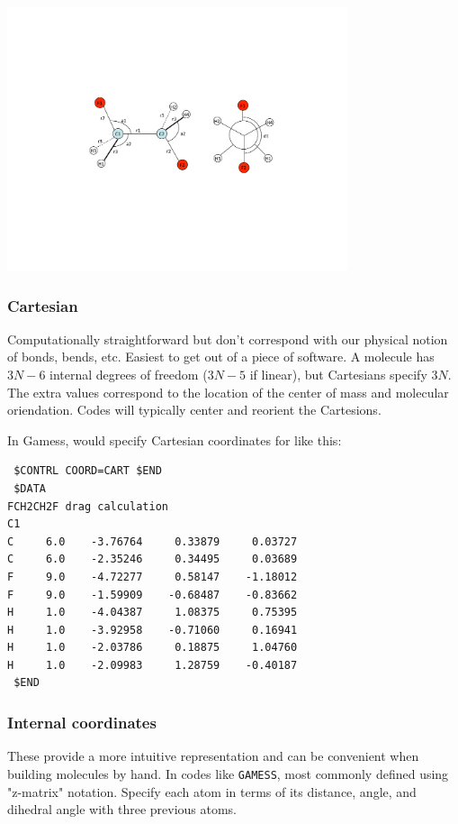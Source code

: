 \documentclass[11pt]{article}
\begin{document}
\begin{center}
\includegraphics[width=0.75\textwidth]{./Images/Internals.pdf}
\end{center}

\subsubsection{Cartesian}
\label{sec-6-1-1}
Computationally straightforward but don't correspond with our physical notion of bonds,
bends, etc.  Easiest to get out of a piece of software.  A molecule has \(3 N-6 \) internal degrees of freedom (\(3N-5\) if linear), but Cartesians specify \(3N\).  The extra values correspond to the location of the center of mass and molecular oriendation.  Codes will typically center and reorient the Cartesions.

In Gamess, would specify Cartesian coordinates for  like this:
\begin{verbatim}
 $CONTRL COORD=CART $END
 $DATA
FCH2CH2F drag calculation
C1
C     6.0    -3.76764     0.33879     0.03727
C     6.0    -2.35246     0.34495     0.03689
F     9.0    -4.72277     0.58147    -1.18012
F     9.0    -1.59909    -0.68487    -0.83662
H     1.0    -4.04387     1.08375     0.75395
H     1.0    -3.92958    -0.71060     0.16941
H     1.0    -2.03786     0.18875     1.04760
H     1.0    -2.09983     1.28759    -0.40187
 $END
\end{verbatim}
\subsubsection{Internal coordinates}
\label{sec-6-1-2}
These provide a more intuitive representation and can be convenient when building molecules by hand.  In codes like \texttt{GAMESS}, most commonly defined using "z-matrix" notation. Specify  each atom in terms of its distance, angle, and dihedral angle with three previous atoms.
\end{document}
